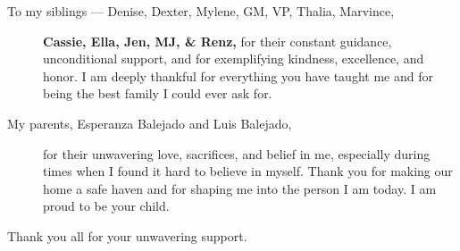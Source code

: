 \begin{description}
    \item[To my siblings --- Denise, Dexter, Mylene, GM, VP, Thalia, Marvince,]\textbf{Cassie, Ella, Jen, MJ, \& Renz,} for their constant guidance, unconditional support, and for exemplifying kindness, excellence, and honor. I am deeply thankful for everything you have taught me and for being the best family I could ever ask for.

    \item[My parents, Esperanza Balejado and Luis Balejado,] 
    for their unwavering love, sacrifices, and belief in me, especially during times when I found it hard to believe in myself. Thank you for making our home a safe haven and for shaping me into the person I am today. I am proud to be your child.

\end{description}

\noindent Thank you all for your unwavering support.
